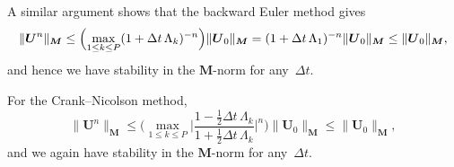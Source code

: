 \begin{example}
A similar argument shows that the backward Euler method gives
\[
\|\boldsymbol{U}^n\|_{\boldsymbol{M}}
    \le\Bigl(\max_{1\le k\le P}(1+\Delta t\,\Lambda_k)^{-n}\Bigr)
    \|\boldsymbol{U}_0\|_{\boldsymbol{M}}
	=(1+\Delta t\,\Lambda_1)^{-n}\|\boldsymbol{U}_0\|_{\boldsymbol{M}}
	\le\|\boldsymbol{U}_0\|_{\boldsymbol{M}},
\]
and hence we have stability in the $\boldsymbol{M}$-norm for any~$\Delta t$.
\end{example}

\begin{example}
For the Crank--Nicolson method,
\[
\|\boldsymbol{U}^n\|_{\boldsymbol{M}}
    \le\biggl(\max_{1\le k\le P}\biggl|
    \frac{1-\tfrac12\Delta t\,\Lambda_k}{1+\tfrac12\Delta t\,\Lambda_k}
    \biggr|^n\biggr)\|\boldsymbol{U}_0\|_{\boldsymbol{M}}
    \le\|\boldsymbol{U}_0\|_{\boldsymbol{M}},
\]
and we again have stability in the $\boldsymbol{M}$-norm for any~$\Delta t$.
\end{example}

